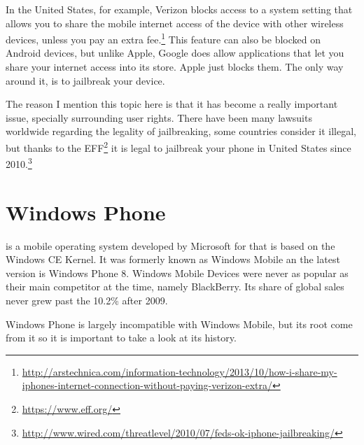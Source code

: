 In the United States, for example, Verizon blocks access to a system setting that allows you to share the mobile internet access of the device with other wireless devices, unless you pay an extra fee.\footnote{\url{http://arstechnica.com/information-technology/2013/10/how-i-share-my-iphones-internet-connection-without-paying-verizon-extra/}} This feature can also be blocked on Android devices, but unlike Apple, Google does allow applications that let you share your internet access into its store. Apple just blocks them. The only way around it, is to jailbreak your device.

The reason I mention this topic here is that it has become a really important issue, specially surrounding user rights. There have been many lawsuits worldwide regarding the legality of jailbreaking, some countries consider it illegal, but thanks to the EFF\footnote{\url{https://www.eff.org/}} it is legal to jailbreak your phone in United States since 2010.\footnote{\url{http://www.wired.com/threatlevel/2010/07/feds-ok-iphone-jailbreaking/}}      

\section{Windows Phone}
 is a mobile operating system developed by Microsoft for that is based on the Windows CE Kernel. It was formerly known as Windows Mobile an the latest version is Windows Phone 8. Windows Mobile Devices were never as popular as their main competitor at the time, namely BlackBerry. Its share of global sales never grew past the 10.2\% after 2009. 


Windows Phone is largely incompatible with Windows Mobile, but its root come from it so it is important to take a look at its history.

